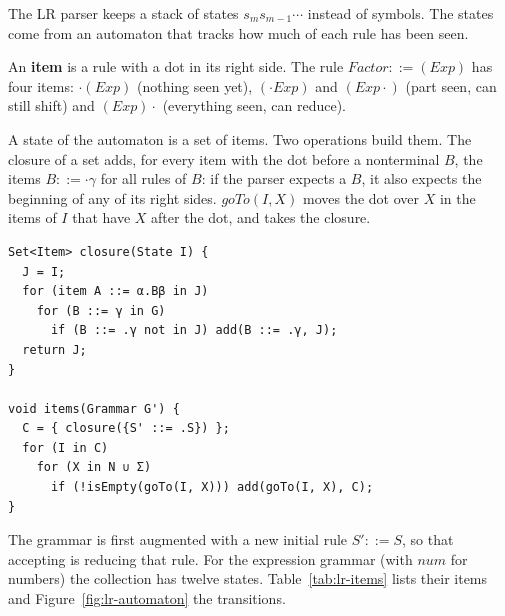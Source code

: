 The LR parser keeps a stack of states $s_m s_{m-1} \cdots$ instead of symbols.
The states come from an automaton that tracks how much of each rule has been
seen.

\begin{definition}
An \textbf{item} is a rule with a dot in its right side. The rule
$\mathit{Factor} ::= (\mathit{Exp})$ has four items: $\cdot(\mathit{Exp})$ (nothing
seen yet), $(\cdot\mathit{Exp})$ and $(\mathit{Exp}\cdot)$ (part seen, can still
shift) and $(\mathit{Exp})\cdot$ (everything seen, can reduce).
\end{definition}

A state of the automaton is a set of items. Two operations build them. The
closure of a set adds, for every item with the dot before a nonterminal $B$,
the items $B ::= \cdot\gamma$ for all rules of $B$: if the parser expects a $B$,
it also expects the beginning of any of its right sides. $\mathit{goTo}(I, X)$
moves the dot over $X$ in the items of $I$ that have $X$ after the dot, and
takes the closure.
\begin{lstlisting}
Set<Item> closure(State I) {
  J = I;
  for (item A ::= α.Bβ in J)
    for (B ::= γ in G)
      if (B ::= .γ not in J) add(B ::= .γ, J);
  return J;
}

void items(Grammar G') {
  C = { closure({S' ::= .S}) };
  for (I in C)
    for (X in N ∪ Σ)
      if (!isEmpty(goTo(I, X))) add(goTo(I, X), C);
}
\end{lstlisting}
The grammar is first augmented with a new initial rule $S' ::= S$, so that
accepting is reducing that rule. For the expression grammar (with
$\mathit{num}$ for numbers) the collection has twelve states.
Table~\ref{tab:lr-items} lists their items and Figure~\ref{fig:lr-automaton}
the transitions.

